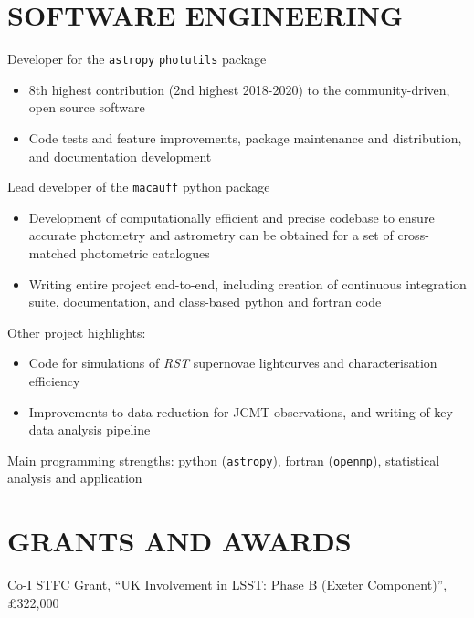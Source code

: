 \documentclass[letter, margin, 10pt]{res} %
\begin{document}
\begin{resume}
\section{SOFTWARE ENGINEERING}

Developer for the \texttt{astropy} \texttt{photutils} package
\begin{itemize}[noitemsep,topsep=0pt,parsep=0pt,partopsep=0pt]
\item 8th highest contribution (2nd highest 2018-2020) to the community-driven, open source software
\item Code tests and feature improvements, package maintenance and distribution, and documentation development
\end{itemize}
\vspace{-10pt}
Lead developer of the \texttt{macauff} python package
\begin{itemize}[noitemsep,topsep=0pt,parsep=0pt,partopsep=0pt]
\item Development of computationally efficient and precise codebase to ensure accurate photometry and astrometry can be obtained for a set of cross-matched photometric catalogues
\item Writing entire project end-to-end, including creation of continuous integration suite, documentation, and class-based python and fortran code
\end{itemize}
\vspace{-10pt}
Other project highlights:
\begin{itemize}[noitemsep,topsep=0pt,parsep=0pt,partopsep=0pt]
\item Code for simulations of \textit{RST} supernovae lightcurves and characterisation efficiency
\item Improvements to data reduction for JCMT observations, and writing of key data analysis pipeline
\end{itemize}
\vspace{-10pt}
Main programming strengths: python (\texttt{astropy}), fortran (\texttt{openmp}), statistical analysis and application

\parskip 5pt
\vspace{-6pt}
\section{GRANTS AND AWARDS}
Co-I STFC Grant, ``UK Involvement in LSST: Phase B (Exeter Component)'', £322,000


\end{resume}
\end{document}
